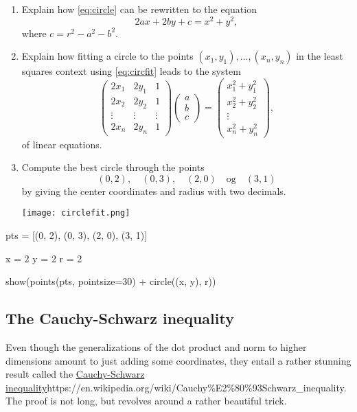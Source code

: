 \documentclass{article}
\begin{document}
\begin{enumerate}
\item
  Explain how \eqref{eq:circle} can be rewritten to the equation
\begin{equation}\label{eq:circfit}
2 a x + 2 b y + c = x^2 + y^2,
\end{equation}
where $c = r^2 - a^2 - b^2$.

\item
  Explain how fitting a circle to the points $(x_1, y_1), \dots, (x_n, y_n)$
  in the least squares context using \eqref{eq:circfit} leads to the system
$$
\begin{pmatrix}
2 x_1 & 2 y_1 & 1\\
2 x_2 & 2 y_2 & 1\\
\vdots &\vdots &\vdots\\
2 x_n & 2 y_n & 1
\end{pmatrix}
\begin{pmatrix}
a \\
b \\
c
\end{pmatrix}
=
\begin{pmatrix}
x_1^2 + y_1^2\\
x_2^2 + y_2^2\\
\vdots \\
x_n^2 + y_n^2
\end{pmatrix},
$$
of linear equations.

\item

  Compute the best circle through the points
$$
(0, 2),\quad (0, 3),\quad  (2,0)\quad\text{og}\quad (3, 1)
$$ 
by giving the center coordinates and radius with two decimals.

\texttt{[image: circlefit.png]}

\end{enumerate}

\begin{sage}
pts = [(0, 2), (0, 3), (2, 0), (3, 1)]

x = 2
y = 2
r = 2

show(points(pts, pointsize=30) + circle((x, y), r))
\end{sage}

\endshex

\subsection{The Cauchy-Schwarz inequality}

Even though the generalizations of the dot product and norm to higher
dimensions amount to just adding some coordinates, they entail
a rather stunning result called the \url{Cauchy-Schwarz inequality}{https://en.wikipedia.org/wiki/Cauchy\%E2\%80\%93Schwarz_inequality}. The
proof is not long, but revolves around a rather beautiful trick.
\end{document}
